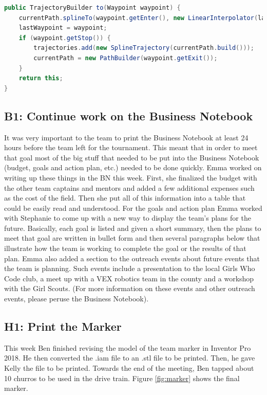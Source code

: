 \documentclass{article}
\begin{document}
\begin{lstlisting}[language=Java]
public TrajectoryBuilder to(Waypoint waypoint) {
	currentPath.splineTo(waypoint.getEnter(), new LinearInterpolator(lastWaypoint.getHeading(), waypoint.getHeading()));
	lastWaypoint = waypoint;
	if (waypoint.getStop()) {
		trajectories.add(new SplineTrajectory(currentPath.build()));
		currentPath = new PathBuilder(waypoint.getExit());
	}
	return this;
}
\end{lstlisting}

\newpage
\subsection{B1: Continue work on the Business Notebook}

It was very important to the team to print the Business Notebook at least 24 hours before the team left for the tournament. This meant that in order to meet that goal most of the big stuff that needed to be put into the Business Notebook (budget, goals and action plan, etc.) needed to be done quickly. Emma worked on writing up these things in the BN this week. First, she finalized the budget with the other team captains and mentors and added a few additional expenses such as the cost of the field. Then she put all of this information into a table that could be easily read and understood. For the goals and action plan Emma worked with Stephanie to come up with a new way to display the team's plans for the future. Basically, each goal is listed and given a short summary, then the plans to meet that goal are written in bullet form and then several paragraphs below that illustrate how the team is working to complete the goal or the results of that plan. Emma also added a section to the outreach events about future events that the team is planning. Such events include a presentation to the local Girls Who Code club, a meet up with a VEX robotics team in the county and a workshop with the Girl Scouts. (For more information on these events and other outreach events, please peruse the Business Notebook). \subsection{H1: Print the Marker}

This week Ben finished revising the model of the team marker in Inventor Pro 2018. He then converted the .iam file to an .stl file to be printed. Then, he gave Kelly the file to be printed. Towards the end of the meeting, Ben tapped about 10 churros to be used in the drive train. Figure \ref{fig:marker} shows the final marker. 
\end{document}

